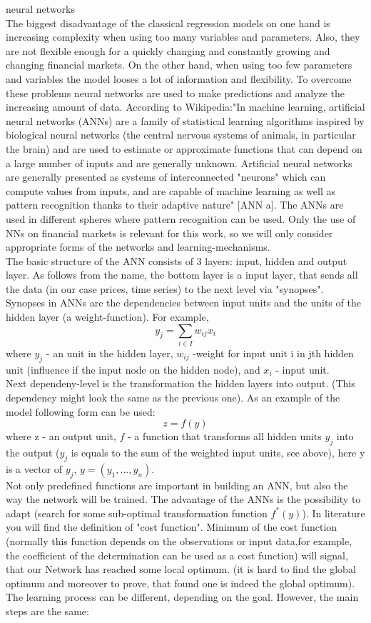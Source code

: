 \documentclass[12pt, a4paper]{article}
\begin{document}
neural networks\\
The biggest disadvantage of the classical regression models on one hand  is increasing complexity when using too many variables and parameters. Also, they are not flexible enough for a quickly changing and constantly growing and changing financial markets. On the other hand, when using too few parameters and variables the model looses a lot of information and flexibility. To overcome these problems neural networks are used to make predictions and analyze the increasing amount of data. According to Wikipedia:"In machine learning, artificial neural networks (ANNs) are a family of statistical learning algorithms inspired by biological neural networks (the central nervous systems of animals, in particular the brain) and are used to estimate or approximate functions that can depend on a large number of inputs and are generally unknown. Artificial neural networks are generally presented as systems of interconnected "neurons" which can compute values from inputs, and are capable of machine learning as well as pattern recognition thanks to their adaptive nature" [ANN a]. The ANNs are used in different spheres where pattern recognition can be used. Only the use of NNs on financial markets is relevant for this work, so we will only consider appropriate forms of the networks and learning-mechanisms.\\
The basic structure of the ANN consists of 3 layers: input, hidden and output layer. As follows from the name, the bottom layer is a input layer, that sends all the data (in our case prices, time series) to the next level via "synopses". Synopses in ANNs are the dependencies between input units and the units of the hidden layer (a weight-function). For example,
\[y_{j} = \sum_{i \in I}w_{ij}x_{i} \]
where $y_{j}$ - an unit in the hidden layer, $w_{ij}$ -weight for input unit i in jth hidden unit (influence if the input node on the hidden node), and $x_{i}$ - input unit.\\
Next dependeny-level is the transformation the hidden layers into output. (This dependency might look the same as the previous one). As an example of the model following form can be used:
\[z=f(y)\]
where z - an output unit, $f$ - a function that transforms all hidden units $y_{j}$ into the output ($y_{j}$ is equals to the sum of the weighted input units, see above), here y is a vector of $y_{j}$, $y=(y_{1},...,y_{n})$.\\
Not only predefined functions are important in building an ANN, but also the way the network will be trained. The advantage of the ANNs is the possibility to adapt (search for some sub-optimal transformation function $f^*(y)$). In literature you will find the definition of "cost function". Minimum of the cost function (normally this function depends on the observations or input data,for example, the coefficient of the determination can be used as a cost function) will signal, that our Network has reached some local optimum. (it is hard to find the global optimum and moreover to prove, that found one is indeed the global optimum). The learning process can be different, depending on the goal. However, the main steps are the same:\\
\end{document}
